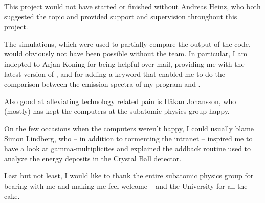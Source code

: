 \thispagestyle{empty}
This project would not have started or finished without Andreas Heinz, who both suggested the topic and provided support and supervision throughout this project.

The  simulations, which were used to partially compare the output of the code, would obviously not have been possible without the  team. In particular, I am indepted to Arjan Koning for being helpful over mail, providing me with the latest version of , and for adding a  keyword that enabled me to do the comparison between the emission spectra of my program and .

Also good at alleviating technology related pain is Håkan Johansson, who (mostly) has kept the computers at the subatomic physics group happy.

On the few occasions when the computers weren't happy, I could usually blame Simon Lindberg, who -- in addition to tormenting the intranet -- inspired me to have a look at gamma-multiplicites and explained the addback routine used to analyze the energy deposits in the Crystal Ball detector.

Last but not least, I would like to thank the entire subatomic physics group for bearing with me and making me feel welcome -- and the University for all the cake.